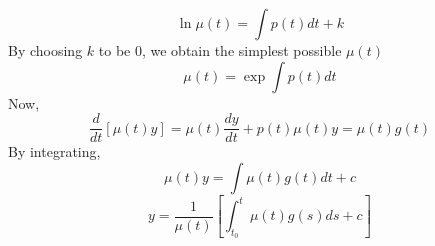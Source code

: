     \begin{equation*}
        \ln \mu(t) = \int p(t) dt + k
    \end{equation*}
    By choosing $k$ to be 0, we obtain the simplest possible $\mu(t)$
    \begin{equation*}
        \mu(t) = \exp \int p(t) dt
    \end{equation*}
    Now,
    \begin{equation*}
        \frac{d}{dt}[\mu(t)y] = \mu(t)\frac{dy}{dt} + p(t)\mu(t)y = \mu(t)g(t)
    \end{equation*}
    By integrating,
    \begin{equation*}
        \mu(t)y = \int \mu(t)g(t)dt + c
    \end{equation*}
    \begin{equation*}
        y = \frac{1}{\mu(t)}[\int_{t_0}^t \mu(t)g(s)ds + c]
    \end{equation*}
        
        